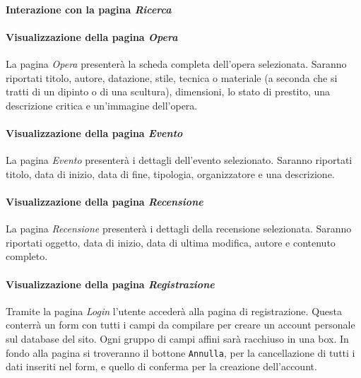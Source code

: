 \paragraph{Interazione con la pagina \textit{Ricerca}}
\label{analisi-casi-uso-attori-principali-utente-generico-14}

\paragraph{Visualizzazione della pagina \textit{Opera}}
\label{analisi-casi-uso-attori-principali-utente-generico-15}
La pagina \textit{Opera} presenterà la scheda completa dell'opera selezionata. Saranno riportati titolo,  autore, datazione, stile, tecnica o materiale (a seconda che si tratti di un dipinto o di una scultura), dimensioni, lo stato di prestito, una descrizione critica e un'immagine dell'opera.

\paragraph{Visualizzazione della pagina \textit{Evento}}
\label{analisi-casi-uso-attori-principali-utente-generico-16}
La pagina \textit{Evento} presenterà i dettagli dell'evento selezionato. Saranno riportati titolo, data di inizio, data di fine, tipologia, organizzatore e una descrizione.

\paragraph{Visualizzazione della pagina \textit{Recensione}}
\label{analisi-casi-uso-attori-principali-utente-generico-17}
La pagina \textit{Recensione} presenterà i dettagli della recensione selezionata. Saranno riportati oggetto, data di inizio, data di ultima modifica, autore e contenuto completo.

\paragraph{Visualizzazione della pagina \textit{Registrazione}}
\label{analisi-casi-uso-attori-principali-utente-generico-18}
Tramite la pagina \textit{Login} l'utente accederà alla pagina di registrazione. Questa conterrà un form con tutti i campi da compilare per creare un account personale sul database del sito. Ogni gruppo di campi affini sarà racchiuso in una box. In fondo alla pagina si troveranno il bottone \texttt{Annulla}, per la cancellazione di tutti i dati inseriti nel form, e quello di conferma per la creazione dell'account.

